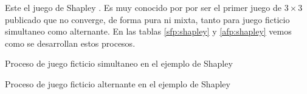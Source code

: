 

Este el juego de Shapley \cite{shapley:3x3}. Es muy conocido por por ser el primer juego de $3 \times 3$ publicado que no converge, de forma pura ni mixta, tanto para juego ficticio simultaneo como alternante. En las tablas \ref{sfp:shapley} y \ref{afp:shapley} vemos como se desarrollan estos procesos.


\begin{table} %
    \centering
    
    \caption{Proceso de juego ficticio simultaneo en el ejemplo de Shapley}
    \label{sfp:shapley}
\end{table}
\begin{table} %
    \centering
    
    \caption{Proceso de juego ficticio alternante en el ejemplo de Shapley}
    \label{afp:shapley}
\end{table}


